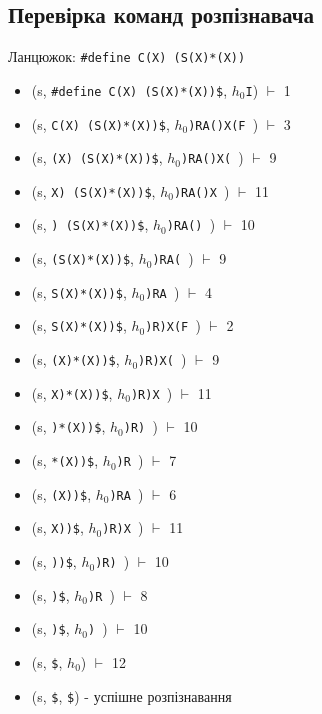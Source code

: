 \newpage
\subsection{Перевірка команд розпізнавача}
Ланцюжок: \verb|#define C(X) (S(X)*(X))|

\begin{itemize}
    \item[]  (s, \quad \verb|#define C(X) (S(X)*(X))$|,           \quad $h_{0}$\verb|I|)      $\vdash$ 1
    \item[]  (s, \quad \verb|C(X) (S(X)*(X))$|,           \quad $h_{0}$\verb|)RA()X(F |)      $\vdash$ 3
    \item[]  (s, \quad \verb|(X) (S(X)*(X))$|,           \quad $h_{0}$\verb|)RA()X( |)        $\vdash$ 9
    \item[]  (s, \quad \verb|X) (S(X)*(X))$|,           \quad $h_{0}$\verb|)RA()X |)          $\vdash$ 11
    \item[]  (s, \quad \verb|) (S(X)*(X))$|,           \quad $h_{0}$\verb|)RA() |)            $\vdash$ 10
    \item[]  (s, \quad \verb|(S(X)*(X))$|,           \quad $h_{0}$\verb|)RA( |)               $\vdash$ 9
    \item[]  (s, \quad \verb|S(X)*(X))$|,           \quad $h_{0}$\verb|)RA |)                 $\vdash$ 4
    \item[]  (s, \quad \verb|S(X)*(X))$|,           \quad $h_{0}$\verb|)R)X(F |)              $\vdash$ 2
    \item[]  (s, \quad \verb|(X)*(X))$|,           \quad $h_{0}$\verb|)R)X( |)                $\vdash$ 9
    \item[]  (s, \quad \verb|X)*(X))$|,           \quad $h_{0}$\verb|)R)X |)                  $\vdash$ 11
    \item[]  (s, \quad \verb|)*(X))$|,           \quad $h_{0}$\verb|)R) |)                    $\vdash$ 10
    \item[]  (s, \quad \verb|*(X))$|,           \quad $h_{0}$\verb|)R |)                      $\vdash$ 7
    \item[]  (s, \quad \verb|(X))$|,           \quad $h_{0}$\verb|)RA |)                      $\vdash$ 6
    \item[]  (s, \quad \verb|X))$|,           \quad $h_{0}$\verb|)R)X |)                      $\vdash$ 11
    \item[]  (s, \quad \verb|))$|,           \quad $h_{0}$\verb|)R) |)                        $\vdash$ 10
    \item[]  (s, \quad \verb|)$|,           \quad $h_{0}$\verb|)R |)                          $\vdash$ 8
    \item[]  (s, \quad \verb|)$|,           \quad $h_{0}$\verb|) |)                           $\vdash$ 10
    \item[]  (s, \quad \verb|$|,           \quad $h_{0}$\verb||)                              $\vdash$ 12
    \item[]  (s, \quad \verb|$|,           \quad \verb|$|) - успішне розпізнавання













\end{itemize}
